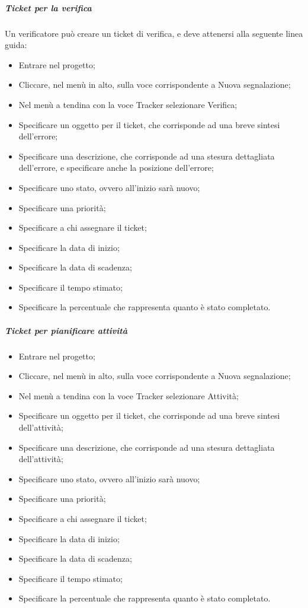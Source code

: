 \subparagraph{Ticket per la verifica}
Un verificatore può creare un ticket di verifica, e deve attenersi alla seguente linea guida:
\begin{itemize}
\item Entrare nel progetto;
\item Cliccare, nel menù in alto, sulla voce corrispondente a Nuova segnalazione;
\item Nel menù a tendina con la voce Tracker selezionare Verifica;
\item Specificare un oggetto per il ticket, che corrisponde ad una breve sintesi dell'errore;
\item Specificare una descrizione, che corrisponde ad una stesura dettagliata dell'errore, e specificare anche la posizione dell'errore;
\item Specificare uno stato, ovvero all'inizio sarà nuovo;
\item Specificare una priorità;
\item Specificare a chi assegnare il ticket;
\item Specificare la data di inizio;
\item Specificare la data di scadenza;
\item Specificare il tempo stimato;
\item Specificare la percentuale che rappresenta quanto è stato completato.
\end{itemize}

\subparagraph{Ticket per pianificare attività}
\begin{itemize}
\item Entrare nel progetto;
\item Cliccare, nel menù in alto, sulla voce corrispondente a Nuova segnalazione;
\item Nel menù a tendina con la voce Tracker selezionare Attività;
\item Specificare un oggetto per il ticket, che corrisponde ad una breve sintesi dell'attività;
\item Specificare una descrizione, che corrisponde ad una stesura dettagliata dell'attività;
\item Specificare uno stato, ovvero all'inizio sarà nuovo;
\item Specificare una priorità;
\item Specificare a chi assegnare il ticket;
\item Specificare la data di inizio;
\item Specificare la data di scadenza;
\item Specificare il tempo stimato;
\item Specificare la percentuale che rappresenta quanto è stato completato.
\end{itemize}

